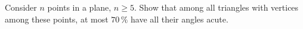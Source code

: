 Consider $n$ points in a plane, $n \geq 5$. Show that among all triangles with vertices among these points, at most $70\,\%$ have all their angles acute.
